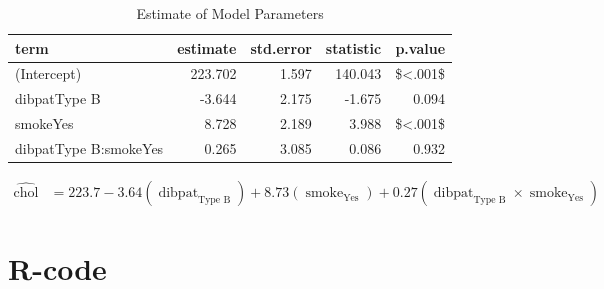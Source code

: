 \documentclass[
  12pt,
  oneside]{article}
\begin{document}
\begin{table}[H]

\caption{\label{tab:Table-11}Estimate of Model Parameters}
\centering
\begin{tabular}[t]{lrrrr}
\toprule
term & estimate & std.error & statistic & p.value\\
\midrule
(Intercept) & 223.702 & 1.597 & 140.043 & \$<.001\$\\
dibpatType B & -3.644 & 2.175 & -1.675 & 0.094\\
smokeYes & 8.728 & 2.189 & 3.988 & \$<.001\$\\
dibpatType B:smokeYes & 0.265 & 3.085 & 0.086 & 0.932\\
\bottomrule
\end{tabular}
\end{table}

\begin{equation}
\begin{aligned}
\operatorname{\widehat{chol}} &= 223.7 - 3.64(\operatorname{dibpat}_{\operatorname{Type\ B}}) + 8.73(\operatorname{smoke}_{\operatorname{Yes}}) + 0.27(\operatorname{dibpat}_{\operatorname{Type\ B}} \times \operatorname{smoke}_{\operatorname{Yes}})
\end{aligned}
\end{equation}

\clearpage

\hypertarget{r-code}{%
\section{R-code}\label{r-code}}
\end{document}
